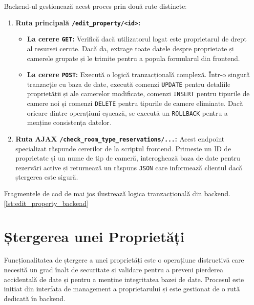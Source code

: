 \documentclass[12pt, a4paper, oneside, romanian]{teza-upb}
\begin{document}
Backend-ul gestionează acest proces prin două rute distincte:
\begin{enumerate}
	\item \textbf{Ruta principală \texttt{/edit\_property/<id>}:}
	\begin{itemize}
		\item \textbf{La cerere \texttt{GET}:} Verifică dacă utilizatorul logat este proprietarul de drept al resursei cerute. Dacă da, extrage toate datele despre proprietate și camerele grupate și le trimite pentru a popula formularul din frontend.
		\item \textbf{La cerere \texttt{POST}:} Execută o logică tranzacțională complexă. Într-o singură tranzacție cu baza de date, execută comenzi \texttt{UPDATE} pentru detaliile proprietății și ale camerelor modificate, comenzi \texttt{INSERT} pentru tipurile de camere noi și comenzi \texttt{DELETE} pentru tipurile de camere eliminate. Dacă oricare dintre operațiuni eșuează, se execută un \texttt{ROLLBACK} pentru a menține consistența datelor.
	\end{itemize}
	\item \textbf{Ruta AJAX \texttt{/check\_room\_type\_reservations/...}:} Acest endpoint specializat răspunde cererilor de la scriptul frontend. Primește un ID de proprietate și un nume de tip de cameră, interoghează baza de date pentru rezervări active și returnează un răspuns \texttt{JSON} care informează clientul dacă ștergerea este sigură.
\end{enumerate}


Fragmentele de cod de mai jos ilustrează logica tranzacțională din backend. \ref{lst:edit_property_backend}



\section{Ștergerea unei Proprietăți}
Funcționalitatea de ștergere a unei proprietăți este o operațiune distructivă care necesită un grad înalt de securitate și validare pentru a preveni pierderea accidentală de date și pentru a menține integritatea bazei de date. Procesul este inițiat din interfața de management a proprietarului și este gestionat de o rută dedicată în backend.
\end{document}
